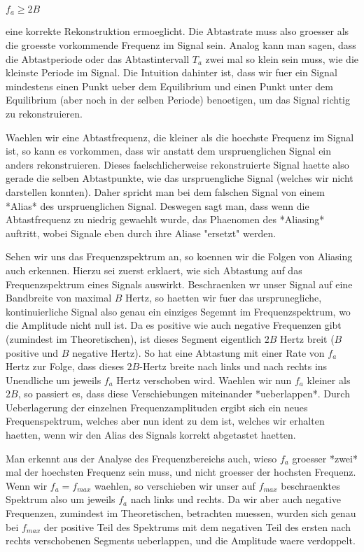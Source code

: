 $f_a \geq 2B$

eine korrekte Rekonstruktion ermoeglicht. Die Abtastrate muss also groesser als
die groesste vorkommende Frequenz im Signal sein. Analog kann man sagen, dass
die Abtastperiode oder das Abtastintervall $T_a$ zwei mal so klein sein muss,
wie die kleinste Periode im Signal. Die Intuition dahinter ist, dass wir fuer
ein Signal mindestens einen Punkt ueber dem Equilibrium und einen Punkt unter
dem Equilibrium (aber noch in der selben Periode) benoetigen, um das Signal
richtig zu rekonstruieren.

Waehlen wir eine Abtastfrequenz, die kleiner als die hoechste Frequenz im Signal
ist, so kann es vorkommen, dass wir anstatt dem urspruenglichen Signal ein
anders rekonstruieren. Dieses faelschlicherweise rekonstruierte Signal haette
also gerade die selben Abtastpunkte, wie das urspruengliche Signal (welches wir
nicht darstellen konnten). Daher spricht man bei dem falschen Signal von einem
*Alias* des urspruenglichen Signal. Deswegen sagt man, dass wenn die
Abtastfrequenz zu niedrig gewaehlt wurde, das Phaenomen des *Aliasing* auftritt,
wobei Signale eben durch ihre Aliase "ersetzt" werden.

Sehen wir uns das Frequenzspektrum an, so koennen wir die Folgen von Aliasing
auch erkennen. Hierzu sei zuerst erklaert, wie sich Abtastung auf das
Frequenzspektrum eines Signals auswirkt. Beschraenken wr unser Signal auf eine
Bandbreite von maximal $B$ Hertz, so haetten wir fuer das ursprunegliche,
kontinuierliche Signal also genau ein einziges Segemnt im Frequenzspektrum, wo
die Amplitude nicht null ist. Da es positive wie auch negative Frequenzen gibt
(zumindest im Theoretischen), ist dieses Segment eigentlich $2B$ Hertz breit
($B$ positive und $B$ negative Hertz). So hat eine Abtastung mit einer Rate von
$f_a$ Hertz zur Folge, dass dieses $2B$-Hertz breite nach links und nach rechts
ins Unendliche um jeweils $f_a$ Hertz verschoben wird. Waehlen wir nun $f_a$
kleiner als $2B$, so passiert es, dass diese Verschiebungen miteinander
*ueberlappen*. Durch Ueberlagerung der einzelnen Frequenzamplituden ergibt sich
ein neues Frequenspektrum, welches aber nun ident zu dem ist, welches wir
erhalten haetten, wenn wir den Alias des Signals korrekt abgetastet haetten.

Man erkennt aus der Analyse des Frequenzbereichs auch, wieso $f_a$ groesser
*zwei* mal der hoechsten Frequenz sein muss, und nicht groesser der hochsten
Frequenz. Wenn wir $f_a = f_{max}$ waehlen, so verschieben wir unser auf
$f_{max}$ beschraenktes Spektrum also um jeweils $f_a$ nach links und rechts. Da
wir aber auch negative Frequenzen, zumindest im Theoretischen, betrachten
muessen, wurden sich genau bei $f_{max}$ der positive Teil des Spektrums mit dem
negativen Teil des ersten nach rechts verschobenen Segments ueberlappen, und die
Amplitude waere verdoppelt.

